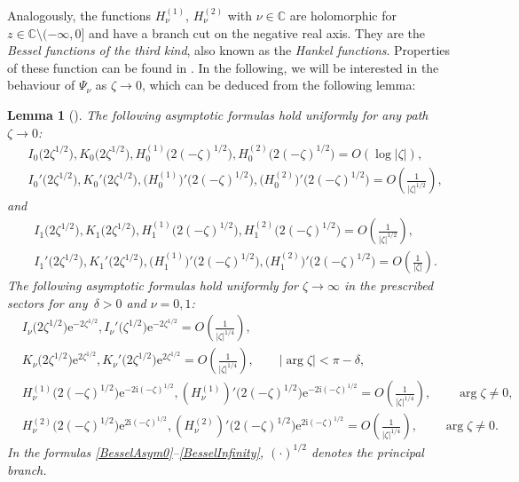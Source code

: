 \documentclass[11pt]{article}
\numberwithin{equation}{section}
\newcommand{\C}{\mathbb{C}}
\newcommand{\I}{\mathrm{i}}
\newcommand{\E}{\mathrm{e}}
\newtheorem{Lemma}[Theorem]{Lemma}
\numberwithin{equation}{section}
\begin{document}
Analogously, the functions $H^{(1)}_\nu$, $H^{(2)}_\nu$ with $\nu \in \C$ are holomorphic for $z\in\C \setminus (-\infty, 0]$ and have a branch cut on the negative real axis. They are the \emph{Bessel functions of the third kind}, also known as the \emph{Hankel functions}. Properties of these function can be found in \cite[Section~10]{DLMF}. In the following, we will be interested in the behaviour of $\Psi_\nu$ as $\zeta \to 0$, which can be deduced from the following lemma:
\begin{Lemma}[{\cite[Section~10]{DLMF}}]
The following asymptotic formulas hold uniformly for any path $\zeta \to 0$:
\begin{align}
& I_0\big(2\zeta^{1/2}\big), K_0\big(2\zeta^{1/2}\big), H^{(1)}_0\big(2(-\zeta)^{1/2}\big), H^{(2)}_0\big(2(-\zeta)^{1/2}\big) = O(\log |\zeta|),\nonumber
 \\
 &I_0'\big(2\zeta^{1/2}\big), K_0'\big(2\zeta^{1/2}\big), \big(H^{(1)}_0\big)'\big(2(-\zeta)^{1/2}\big), \big(H^{(2)}_0\big)'\big(2(-\zeta)^{1/2}\big) = O\left(\frac{1}{|\zeta|^{1/2}}\right),\label{BesselAsym0}
\end{align}
 and
\begin{align}
 &I_1\big(2\zeta^{1/2}\big), K_1\big(2\zeta^{1/2}\big), H^{(1)}_1\big(2(-\zeta)^{1/2}\big), H^{(2)}_1\big(2(-\zeta)^{1/2}\big) = O\left(\frac{1}{|\zeta|^{1/2}}\right),\nonumber
 \\
 &I_1'\big(2\zeta^{1/2}\big), K_1'\big(2\zeta^{1/2}\big), \big(H^{(1)}_1\big)'\big(2(-\zeta)^{1/2}\big), \big(H^{(2)}_1\big)'\big(2(-\zeta)^{1/2}\big) = O\left(\frac{1}{|\zeta|}\right).\label{BesselAsym1}
\end{align}
The following asymptotic formulas hold uniformly for $\zeta \to \infty$ in the prescribed sectors for any~$\delta >0$ and $\nu = 0,1$:
\begin{align}
& I_\nu\big(2\zeta^{1/2}\big)\E^{-2\zeta^{1/2}}, I_\nu'\big(\zeta^{1/2}\big)\E^{-2\zeta^{1/2}} = O\left(\frac{1}{|\zeta|^{1/4}} \right),\nonumber
 \\
 &K_\nu\big(2\zeta^{1/2}\big)\E^{2\zeta^{1/2}}, K_\nu'\big(2\zeta^{1/2}\big)\E^{2\zeta^{1/2}} = O\left(\frac{1}{|\zeta|^{1/4}} \right),
 \qquad|\arg \zeta|<\pi-\delta,\nonumber
 \\
 &H^{(1)}_\nu\big(2(-\zeta)^{1/2}\big)\E^{-2\I(-\zeta)^{1/2}}, (H^{(1)}_\nu)'\big(2(-\zeta)^{1/2}\big)\E^{-2\I(-\zeta)^{1/2}} = O\left(\frac{1}{|\zeta|^{1/4}} \right), \qquad \arg \zeta \not = 0,\nonumber
 \\
 &H^{(2)}_\nu\big(2(-\zeta)^{1/2}\big)\E^{2\I(-\zeta)^{1/2}}, (H^{(2)}_\nu)'\big(2(-\zeta)^{1/2}\big)\E^{2\I(-\zeta)^{1/2}} = O\left(\frac{1}{|\zeta|^{1/4}} \right), \qquad \arg \zeta \not = 0.\label{BesselInfinity}
\end{align}
In the formulas \eqref{BesselAsym0}--\eqref{BesselInfinity}, $(\cdot)^{1/2}$ denotes the principal branch.
\end{Lemma}
\end{document}
